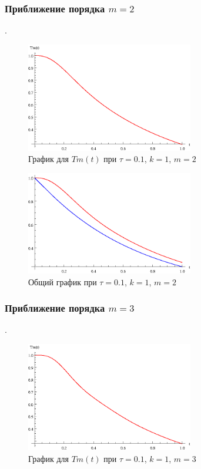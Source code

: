 \newpage

\subsubsection{Приближение порядка $m=2$}.

\begin{figure}[h]
\begin{center}
\includegraphics[width=0.65\textwidth]{./3_results/1_4.eps}
\end{center}
\caption{График для $Tm(t)$ при $\tau=0.1$, $k=1$, $m=2$}
\end{figure}

\begin{figure}[h]
\begin{center}
\includegraphics[width=0.65\textwidth]{./3_results/1_5.eps}
\end{center}
\caption{Общий график при $\tau=0.1$, $k=1$, $m=2$}
\end{figure}

\newpage

\subsubsection{Приближение порядка $m=3$}.

\begin{figure}[h]
\begin{center}
\includegraphics[width=0.65\textwidth]{./3_results/1_6.eps}
\end{center}
\caption{График для $Tm(t)$ при $\tau=0.1$, $k=1$, $m=3$}
\end{figure}


